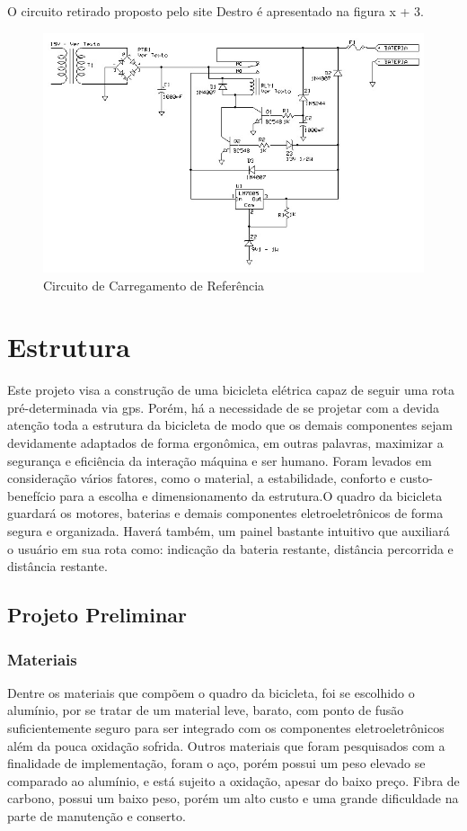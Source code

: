 O circuito retirado proposto pelo site Destro é apresentado na figura x + 3.

	\begin{figure}[!htb]
		\centering
		\includegraphics[width=\textwidth]{circuito_carregamento.jpeg}
		\caption{Circuito de Carregamento de Referência}
		\label{img:circuitocarregamento}
	\end{figure}
  
  \section{Estrutura}
  Este projeto visa a construção de uma bicicleta elétrica capaz de seguir uma rota pré-determinada via gps. Porém, há a necessidade de se projetar com a devida atenção toda a estrutura da bicicleta de modo que os demais componentes sejam devidamente adaptados de forma ergonômica, em outras palavras, maximizar a segurança e eficiência da interação máquina e ser humano.
Foram levados em consideração vários fatores, como o material, a estabilidade, conforto e custo-benefício para a escolha e dimensionamento da estrutura.O quadro da bicicleta guardará os motores, baterias e demais componentes eletroeletrônicos de forma segura e organizada. Haverá também, um painel bastante intuitivo que auxiliará o usuário em sua rota como: indicação da bateria restante, distância percorrida e distância restante.
	\subsection{Projeto Preliminar}
		\subsubsection{Materiais}
		Dentre os materiais que compõem o quadro da bicicleta, foi se escolhido o alumínio, por se tratar de um material leve, barato, com ponto de fusão suficientemente seguro para ser integrado com os componentes eletroeletrônicos além da pouca oxidação sofrida. Outros materiais que foram pesquisados com a finalidade de implementação, foram o aço, porém possui um peso elevado se comparado ao alumínio, e está sujeito a oxidação, apesar do baixo preço. Fibra de carbono, possui um baixo peso, porém um alto custo e uma grande dificuldade na parte de manutenção e conserto.
		
